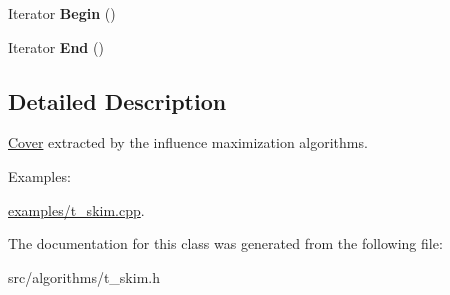 \begin{DoxyCompactItemize}
\item 
\hypertarget{classall__distance__sketch_1_1Cover_a13a97b2eb936508eeff66e9e938b7906}{}Iterator {\bfseries Begin} ()\label{classall__distance__sketch_1_1Cover_a13a97b2eb936508eeff66e9e938b7906}

\item 
\hypertarget{classall__distance__sketch_1_1Cover_a33a0fe311d66e5ce810a1c6f6cebcbe0}{}Iterator {\bfseries End} ()\label{classall__distance__sketch_1_1Cover_a33a0fe311d66e5ce810a1c6f6cebcbe0}

\end{DoxyCompactItemize}


\subsection{Detailed Description}
\hyperlink{classall__distance__sketch_1_1Cover}{Cover} extracted by the influence maximization algorithms. \begin{Desc}
\item[Examples\+: ]\par
\hyperlink{examples_2t_skim_8cpp-example}{examples/t\+\_\+skim.\+cpp}.\end{Desc}


The documentation for this class was generated from the following file\+:\begin{DoxyCompactItemize}
\item 
src/algorithms/t\+\_\+skim.\+h\end{DoxyCompactItemize}
